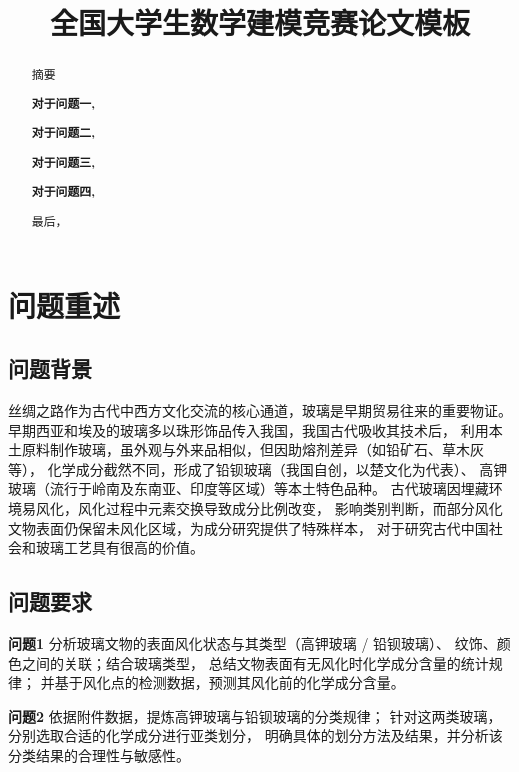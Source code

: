 \documentclass[withoutpreface,bwprint]{cumcmthesis}
\title{全国大学生数学建模竞赛论文模板}  %
\begin{document}
\maketitle
\begin{abstract}
摘要

\textbf{对于问题一,}

\textbf{对于问题二,}

\textbf{对于问题三,}

\textbf{对于问题四,}

最后，



\end{abstract}


\section{问题重述}
\subsection{问题背景}
丝绸之路作为古代中西方文化交流的核心通道，玻璃是早期贸易往来的重要物证。
早期西亚和埃及的玻璃多以珠形饰品传入我国，我国古代吸收其技术后，
利用本土原料制作玻璃，虽外观与外来品相似，但因助熔剂差异（如铅矿石、草木灰等），
化学成分截然不同，形成了铅钡玻璃（我国自创，以楚文化为代表）、
高钾玻璃（流行于岭南及东南亚、印度等区域）等本土特色品种。
古代玻璃因埋藏环境易风化，风化过程中元素交换导致成分比例改变，
影响类别判断，而部分风化文物表面仍保留未风化区域，为成分研究提供了特殊样本，
对于研究古代中国社会和玻璃工艺具有很高的价值。


\subsection{问题要求}

\textbf{问题1}  
分析玻璃文物的表面风化状态与其类型（高钾玻璃 / 铅钡玻璃）、
纹饰、颜色之间的关联；结合玻璃类型，
总结文物表面有无风化时化学成分含量的统计规律；
并基于风化点的检测数据，预测其风化前的化学成分含量。

\textbf{问题2}  
依据附件数据，提炼高钾玻璃与铅钡玻璃的分类规律；
针对这两类玻璃，分别选取合适的化学成分进行亚类划分，
明确具体的划分方法及结果，并分析该分类结果的合理性与敏感性。
\end{document}
